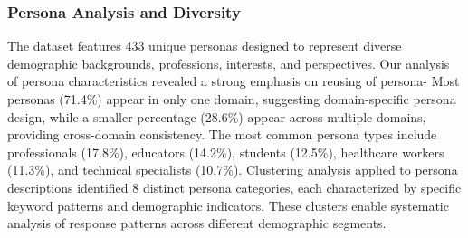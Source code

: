 \documentclass[11pt]{article}
\begin{document}
\subsubsection{Persona Analysis and Diversity}
The dataset features 433 unique personas designed to represent diverse demographic backgrounds, professions, interests, and perspectives. Our analysis of persona characteristics revealed a strong emphasis on reusing of persona- Most personas (71.4\%) appear in only one domain, suggesting domain-specific persona design, while a smaller percentage (28.6\%) appear across multiple domains, providing cross-domain consistency. The most common persona types include professionals (17.8\%), educators (14.2\%), students (12.5\%), healthcare workers (11.3\%), and technical specialists (10.7\%). Clustering analysis applied to persona descriptions identified 8 distinct persona categories, each characterized by specific keyword patterns and demographic indicators. These clusters enable systematic analysis of response patterns across different demographic segments.
\end{document}
